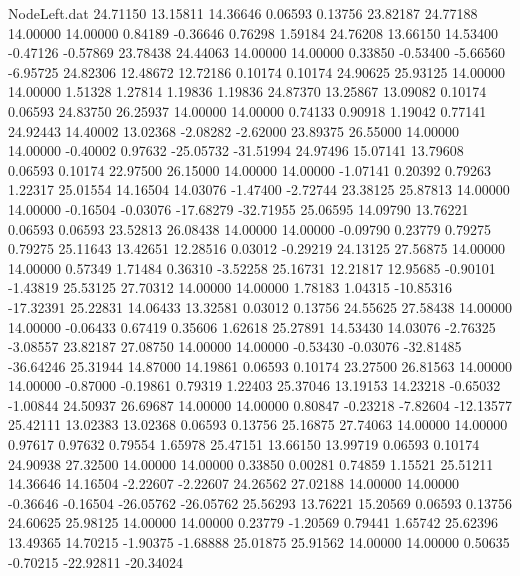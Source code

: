 \begin{filecontents}{NodeLeft.dat}
  24.71150   13.15811   14.36646     0.06593    0.13756   23.82187   24.77188   14.00000   14.00000    0.84189   -0.36646    0.76298    1.59184
  24.76208   13.66150   14.53400    -0.47126   -0.57869   23.78438   24.44063   14.00000   14.00000    0.33850   -0.53400   -5.66560   -6.95725
  24.82306   12.48672   12.72186     0.10174    0.10174   24.90625   25.93125   14.00000   14.00000    1.51328    1.27814    1.19836    1.19836
  24.87370   13.25867   13.09082     0.10174    0.06593   24.83750   26.25937   14.00000   14.00000    0.74133    0.90918    1.19042    0.77141
  24.92443   14.40002   13.02368    -2.08282   -2.62000   23.89375   26.55000   14.00000   14.00000   -0.40002    0.97632  -25.05732  -31.51994
  24.97496   15.07141   13.79608     0.06593    0.10174   22.97500   26.15000   14.00000   14.00000   -1.07141    0.20392    0.79263    1.22317
  25.01554   14.16504   14.03076    -1.47400   -2.72744   23.38125   25.87813   14.00000   14.00000   -0.16504   -0.03076  -17.68279  -32.71955
  25.06595   14.09790   13.76221     0.06593    0.06593   23.52813   26.08438   14.00000   14.00000   -0.09790    0.23779    0.79275    0.79275
  25.11643   13.42651   12.28516     0.03012   -0.29219   24.13125   27.56875   14.00000   14.00000    0.57349    1.71484    0.36310   -3.52258
  25.16731   12.21817   12.95685    -0.90101   -1.43819   25.53125   27.70312   14.00000   14.00000    1.78183    1.04315  -10.85316  -17.32391
  25.22831   14.06433   13.32581     0.03012    0.13756   24.55625   27.58438   14.00000   14.00000   -0.06433    0.67419    0.35606    1.62618
  25.27891   14.53430   14.03076    -2.76325   -3.08557   23.82187   27.08750   14.00000   14.00000   -0.53430   -0.03076  -32.81485  -36.64246
  25.31944   14.87000   14.19861     0.06593    0.10174   23.27500   26.81563   14.00000   14.00000   -0.87000   -0.19861    0.79319    1.22403
  25.37046   13.19153   14.23218    -0.65032   -1.00844   24.50937   26.69687   14.00000   14.00000    0.80847   -0.23218   -7.82604  -12.13577
  25.42111   13.02383   13.02368     0.06593    0.13756   25.16875   27.74063   14.00000   14.00000    0.97617    0.97632    0.79554    1.65978
  25.47151   13.66150   13.99719     0.06593    0.10174   24.90938   27.32500   14.00000   14.00000    0.33850    0.00281    0.74859    1.15521
  25.51211   14.36646   14.16504    -2.22607   -2.22607   24.26562   27.02188   14.00000   14.00000   -0.36646   -0.16504  -26.05762  -26.05762
  25.56293   13.76221   15.20569     0.06593    0.13756   24.60625   25.98125   14.00000   14.00000    0.23779   -1.20569    0.79441    1.65742
  25.62396   13.49365   14.70215    -1.90375   -1.68888   25.01875   25.91562   14.00000   14.00000    0.50635   -0.70215  -22.92811  -20.34024

\end{filecontents}
